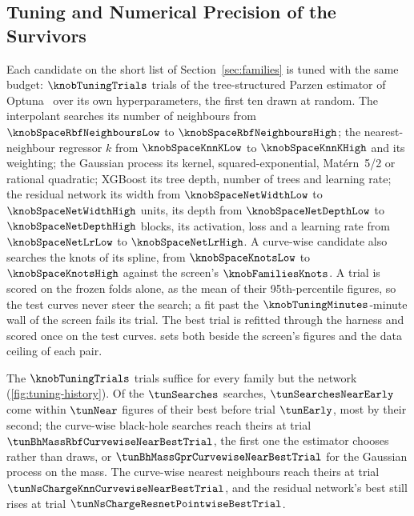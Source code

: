 \subsection{Tuning and Numerical Precision of the Survivors}
\label{sec:precision}

Each candidate on the short list of Section~\ref{sec:families} is tuned with the same budget: $\knobTuningTrials$ trials of the tree-structured Parzen estimator of Optuna~\citep{Akiba2019_Optuna} over its own hyperparameters, the first ten drawn at random. The interpolant searches its number of neighbours from $\knobSpaceRbfNeighboursLow$ to $\knobSpaceRbfNeighboursHigh$; the nearest-neighbour regressor $k$ from $\knobSpaceKnnKLow$ to $\knobSpaceKnnKHigh$ and its weighting; the Gaussian process its kernel, squared-exponential, Mat\'ern~5/2 or rational quadratic; XGBoost its tree depth, number of trees and learning rate; the residual network its width from $\knobSpaceNetWidthLow$ to $\knobSpaceNetWidthHigh$ units, its depth from $\knobSpaceNetDepthLow$ to $\knobSpaceNetDepthHigh$ blocks, its activation, loss and a learning rate from $\knobSpaceNetLrLow$ to $\knobSpaceNetLrHigh$. A curve-wise candidate also searches the knots of its spline, from $\knobSpaceKnotsLow$ to $\knobSpaceKnotsHigh$ against the screen's $\knobFamiliesKnots$. A trial is scored on the frozen folds alone, as the mean of their 95th-percentile figures, so the test curves never steer the search; a fit past the $\knobTuningMinutes$-minute wall of the screen fails its trial. The best trial is refitted through the harness and scored once on the test curves.  sets both beside the screen's figures and the data ceiling of each pair.


The $\knobTuningTrials$ trials suffice for every family but the network (\cref{fig:tuning-history}). Of the $\tunSearches$ searches, $\tunSearchesNearEarly$ come within $\tunNear$ figures of their best before trial $\tunEarly$, most by their second; the curve-wise black-hole searches reach theirs at trial $\tunBhMassRbfCurvewiseNearBestTrial$, the first one the estimator chooses rather than draws, or $\tunBhMassGprCurvewiseNearBestTrial$ for the Gaussian process on the mass. The curve-wise nearest neighbours reach theirs at trial $\tunNsChargeKnnCurvewiseNearBestTrial$, and the residual network's best still rises at trial $\tunNsChargeResnetPointwiseBestTrial$.

